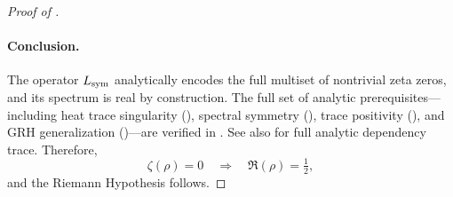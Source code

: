 \begin{proof}[Proof of ]
\paragraph{Conclusion.}
The operator \( L_{\mathrm{sym}} \) analytically encodes the full multiset of nontrivial zeta zeros, and its spectrum is real by construction. The full set of analytic prerequisites—including heat trace singularity (), spectral symmetry (), trace positivity (), and GRH generalization ()—are verified in . See also  for full analytic dependency trace. Therefore,
\[
\zeta(\rho) = 0 \quad \Longrightarrow \quad \Re(\rho) = \tfrac{1}{2},
\]
and the Riemann Hypothesis follows.
\end{proof}
